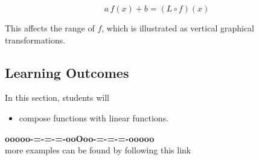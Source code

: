 \documentclass{ximera}
\begin{document}
\[   a \, f(x) + b  = (L \circ f)(x)\]


This affects the range of $f$, which is illustrated as vertical graphical transformations.









\subsection*{Learning Outcomes}


\begin{sectionOutcomes}
In this section, students will 

\begin{itemize}
\item compose functions with linear functions.
\end{itemize}
\end{sectionOutcomes}















\begin{onlineOnly}
\begin{center}
\textbf{\textcolor{green!50!black}{ooooo-=-=-=-ooOoo-=-=-=-ooooo}} \\

more examples can be found by following this link\\ 

\end{center}
\end{onlineOnly}
\end{document}
